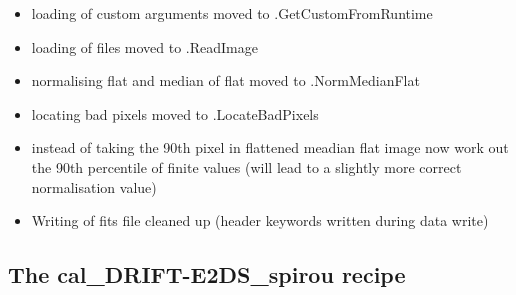 \begin{itemize}
	\item loading of custom arguments moved to \spirouStartup.GetCustomFromRuntime

	\item loading of files moved to \spirouImage.ReadImage

	\item normalising flat and median of flat moved to \spirouImage.NormMedianFlat

	\item locating bad pixels moved to \spirouImage.LocateBadPixels

	\item instead of taking the 90th pixel in flattened meadian flat image now work out the 90th percentile of finite values (will lead to a slightly more correct normalisation value)

	\item Writing of fits file cleaned up (header keywords written during data write)
\end{itemize}


\subsection{The cal\_DRIFT-E2DS\_spirou recipe}
\label{ch:changelog:At4:cal_DRIFT-E2DS_spirou}

